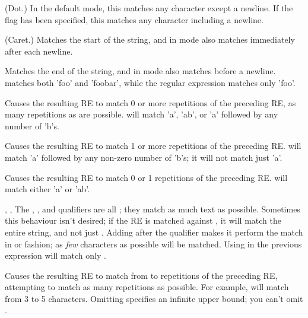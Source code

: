 \begin{list}{}{\leftmargin 0.7in }

\item[\character{.}] (Dot.)  In the default mode, this matches any
character except a newline.  If the  flag has been
specified, this matches any character including a newline.

\item[\character{\^}] (Caret.)  Matches the start of the string, and in
 mode also matches immediately after each newline.

\item[\character{\$}] Matches the end of the string, and in
 mode also matches before a newline.
 matches both 'foo' and 'foobar', while the regular
expression  matches only 'foo'.

\item[\character{*}] Causes the resulting RE to
match 0 or more repetitions of the preceding RE, as many repetitions
as are possible.   will
match 'a', 'ab', or 'a' followed by any number of 'b's.

\item[\character{+}] Causes the
resulting RE to match 1 or more repetitions of the preceding RE.
 will match 'a' followed by any non-zero number of 'b's; it
will not match just 'a'.

\item[\character{?}] Causes the resulting RE to
match 0 or 1 repetitions of the preceding RE.   will
match either 'a' or 'ab'.
\item[\code{*?}, \code{+?}, \code{??}] The \character{*}, \character{+}, and
 qualifiers are all ; they match as much text as
possible.  Sometimes this behaviour isn't desired; if the RE
 is matched against , it will match the
entire string, and not just .
Adding  after the qualifier makes it perform the match in
 or  fashion; as \emph{few} characters as
possible will be matched.  Using  in the previous
expression will match only .

\item[\code{\{\var{m},\var{n}\}}] Causes the resulting RE to match from
 to  repetitions of the preceding RE, attempting to
match as many repetitions as possible.  For example, 
will match from 3 to 5  characters.  Omitting 
specifies an infinite upper bound; you can't omit .


\end{list}
